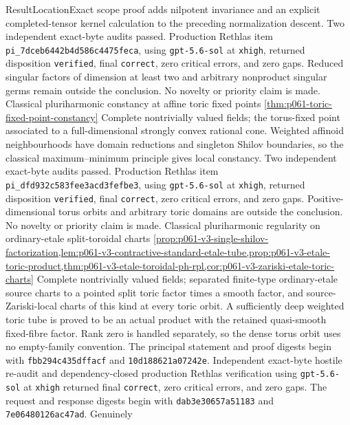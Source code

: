 \begin{AppLProvenanceLedger}{Result}{Location}{Exact scope}
{   proof adds nilpotent invariance and an explicit completed-tensor kernel
   calculation to the preceding normalization descent.  Two independent
   exact-byte audits passed.  Production Rethlas item
   \nolinkurl{pi_7dceb6442b4d586c4475feca}, using
   \texttt{gpt-5.6-sol} at \texttt{xhigh}, returned disposition
   \texttt{verified}, final \texttt{correct}, zero critical errors, and zero
   gaps.  Reduced singular factors of dimension at least two and arbitrary
   nonproduct singular germs remain outside the conclusion.  No novelty or
   priority claim is made.}
\AppLProvenanceRecord
  {Classical pluriharmonic constancy at affine toric fixed points}
  {\cref{thm:p061-toric-fixed-point-constancy}}
  {Complete nontrivially valued fields; the torus-fixed point associated to a
   full-dimensional strongly convex rational cone.  Weighted affinoid
   neighbourhoods have domain reductions and singleton Shilov boundaries,
   so the classical maximum--minimum principle gives local constancy.  Two
   independent exact-byte audits passed.  Production Rethlas item
   \nolinkurl{pi_dfd932c583fee3acd3fefbe3}, using
   \texttt{gpt-5.6-sol} at \texttt{xhigh}, returned disposition
   \texttt{verified}, final \texttt{correct}, zero critical errors, and zero
   gaps.  Positive-dimensional torus orbits and arbitrary toric domains are
   outside the conclusion.  No novelty or priority claim is made.}
\AppLProvenanceRecord
  {Classical pluriharmonic regularity on ordinary-etale split-toroidal charts}
  {\cref{prop:p061-v3-single-shilov-factorization,lem:p061-v3-contractive-standard-etale-tube,prop:p061-v3-etale-toric-product,thm:p061-v3-etale-toroidal-ph-rpl,cor:p061-v3-zariski-etale-toric-charts}}
  {Complete nontrivially valued fields; separated finite-type ordinary-etale
   source charts to a pointed split toric factor times a smooth factor, and
   source-Zariski-local charts of this kind at every toric orbit.  A
   sufficiently deep weighted toric tube is proved to be an actual product
   with the retained quasi-smooth fixed-fibre factor.  Rank zero is handled
   separately, so the dense torus orbit uses no empty-family convention.
   The principal statement and proof digests begin with
   \texttt{fbb294c435dffacf} and \texttt{10d188621a07242e}.
   Independent exact-byte hostile re-audit and dependency-closed production
   Rethlas verification using \texttt{gpt-5.6-sol} at \texttt{xhigh}
   returned final \texttt{correct}, zero critical errors, and zero gaps.
   The request and response digests begin with
   \texttt{dab3e30657a51183} and \texttt{7e06480126ac47ad}.  Genuinely
}
\end{AppLProvenanceLedger}
